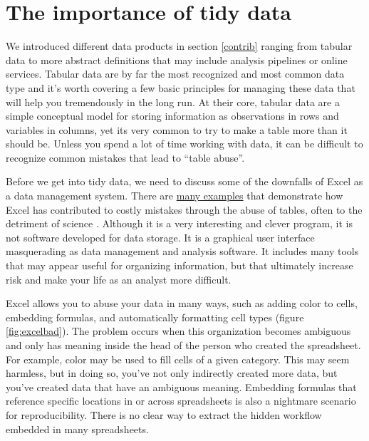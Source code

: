 \documentclass[
]{book}
\begin{document}
\hypertarget{whytidy}{%
\section{The importance of tidy data}\label{whytidy}}

We introduced different data products in section \ref{contrib} ranging from tabular data to more abstract definitions that may include analysis pipelines or online services. Tabular data are by far the most recognized and most common data type and it's worth covering a few basic principles for managing these data that will help you tremendously in the long run. At their core, tabular data are a simple conceptual model for storing information as observations in rows and variables in columns, yet its very common to try to make a table more than it should be. Unless you spend a lot of time working with data, it can be difficult to recognize common mistakes that lead to ``table abuse''.

Before we get into tidy data, we need to discuss some of the downfalls of Excel as a data management system. There are \href{http://www.eusprig.org/horror-stories.htm}{many examples} that demonstrate how Excel has contributed to costly mistakes through the abuse of tables, often to the detriment of science \citep{Ziemann16}. Although it is a very interesting and clever program, it is not software developed for data storage. It is a graphical user interface masquerading as data management and analysis software. It includes many tools that may appear useful for organizing information, but that ultimately increase risk and make your life as an analyst more difficult.

Excel allows you to abuse your data in many ways, such as adding color to cells, embedding formulas, and automatically formatting cell types (figure \ref{fig:excelbad}). The problem occurs when this organization becomes ambiguous and only has meaning inside the head of the person who created the spreadsheet. For example, color may be used to fill cells of a given category. This may seem harmless, but in doing so, you've not only indirectly created more data, but you've created data that have an ambiguous meaning. Embedding formulas that reference specific locations in or across spreadsheets is also a nightmare scenario for reproducibility. There is no clear way to extract the hidden workflow embedded in many spreadsheets.
\end{document}
